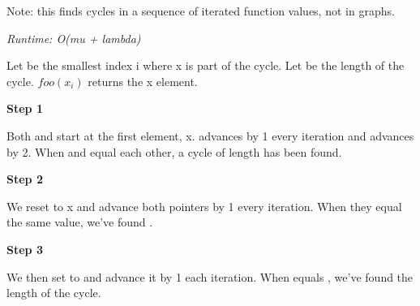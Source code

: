 
Note: this finds cycles in a sequence of iterated function values, not in graphs.

\textit{Runtime: O(mu + lambda)}

Let  be the smallest index i where x is part of the cycle. Let  be the length of the cycle. $foo(x_i)$ returns the x element.

\textbf{Step 1}

Both  and  start at the first element, x.  advances by 1 every iteration and  advances by 2. When  and  equal each other, a cycle of  length has been found.



\textbf{Step 2}

We reset  to x and advance both pointers by 1 every iteration. When they equal the same value, we've found .



\textbf{Step 3}

We then set  to  and advance it by 1 each iteration. When  equals , we've found the length of the cycle.



\newpage
